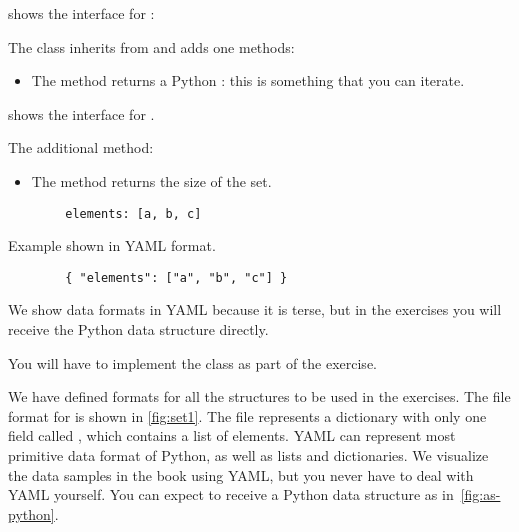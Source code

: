  shows the interface for \EnumerableSet:


The class inherits from \Setoid and adds one methods:
\begin{itemize}
	\item The method  returns a Python \Iterator: this is something that you can iterate.
\end{itemize}
 shows the interface for \FiniteSet.


The additional method:
\begin{itemize}
	\item The method  returns the size of the set.
\end{itemize}

\begin{marginfigure}
	\begin{verbatim}
        elements: [a, b, c]
    \end{verbatim}
	\caption{Example shown in YAML format.}
	\label{fig:set1}
\end{marginfigure}

\begin{marginfigure}
	\begin{verbatim}
        { "elements": ["a", "b", "c"] }
    \end{verbatim}
	\caption{We show data formats in YAML because it is terse, but in the exercises you will receive the Python data structure directly.}
	\label{fig:as-python}
\end{marginfigure}

You will have to implement the \FiniteSet class as part of the exercise.


We have defined formats for all the structures to be used in the exercises.
The file format for \FiniteSet is shown in \cref{fig:set1}.
The file represents a dictionary with only one field called , which contains a list of elements.
YAML can represent most primitive data format of Python, as well as lists and dictionaries.
We visualize the data samples in the book using YAML, but you never have to deal with YAML yourself.
You can expect to receive a Python data structure as in~\cref{fig:as-python}.

